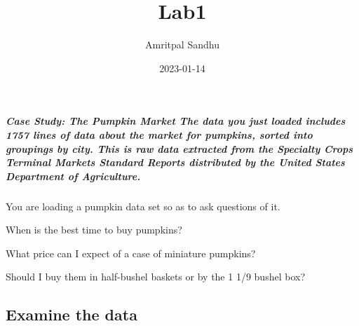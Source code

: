 \documentclass[
]{article}
\title{Lab1}
\author{Amritpal Sandhu}
\date{2023-01-14}
\begin{document}
\maketitle

\hypertarget{case-study-the-pumpkin-market-the-data-you-just-loaded-includes-1757-lines-of-data-about-the-market-for-pumpkins-sorted-into-groupings-by-city.-this-is-raw-data-extracted-from-the-specialty-crops-terminal-markets-standard-reports-distributed-by-the-united-states-department-of-agriculture.}{%
\subparagraph{Case Study: The Pumpkin Market The data you just loaded
includes 1757 lines of data about the market for pumpkins, sorted into
groupings by city. This is raw data extracted from the Specialty Crops
Terminal Markets Standard Reports distributed by the United States
Department of
Agriculture.}\label{case-study-the-pumpkin-market-the-data-you-just-loaded-includes-1757-lines-of-data-about-the-market-for-pumpkins-sorted-into-groupings-by-city.-this-is-raw-data-extracted-from-the-specialty-crops-terminal-markets-standard-reports-distributed-by-the-united-states-department-of-agriculture.}}

You are loading a pumpkin data set so as to ask questions of it.

When is the best time to buy pumpkins?

What price can I expect of a case of miniature pumpkins?

Should I buy them in half-bushel baskets or by the 1 1/9 bushel box?

\hypertarget{examine-the-data}{%
\subsection{Examine the data}\label{examine-the-data}}
\end{document}
